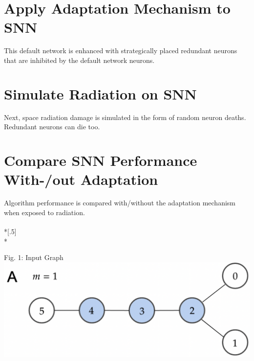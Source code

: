 {\section{Apply Adaptation Mechanism to SNN}\label{subsec:adaptation}
This default network is enhanced with strategically placed redundant neurons that are inhibited by the default network neurons. 


\section{Simulate Radiation on SNN}\label{subsec:}
Next, space radiation damage is simulated in the form of random neuron deaths. Redundant neurons can die too. \vspace{-7em}
\section{Compare SNN Performance With-/out Adaptation}\label{subsec:}
Algorithm performance is compared with/without the adaptation mechanism when exposed to radiation.\\
\\*[.5\baselineskip]
\\*
\vspace{-45em}
\begin{rudifig}{0.49\hsize}{Fig. 1: Input Graph}
    \hspace{-1.5em}
    \includegraphics[width=1.1\linewidth]{latex/Images/input_graph_G_6_0_alternative1.png}

\end{rudifig}}
